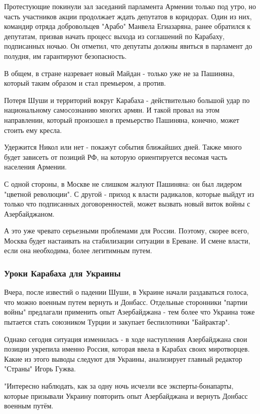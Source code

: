 Протестующие покинули зал заседаний парламента Армении только под утро, но
часть участников акции продолжает ждать депутатов в коридорах. Один из них,
командир отряда добровольцев "Арабо" Манвела Егиазаряна, ранее обратился к
депутатам, призвав начать процесс выхода из соглашений по Карабаху, подписанных
ночью. Он отметил, что депутаты должны явиться в парламент до полудня, им
гарантируют безопасность. 

В общем, в стране назревает новый Майдан - только уже не за Пашиняна, который
таким образом и стал премьером, а против. 

Потеря Шуши и территорий вокруг Карабаха - действительно большой удар по
национальному самосознанию многих армян. И такой провал на этом направлении,
который произошел в премьерство Пашиняна, конечно, может стоить ему кресла. 

Удержится Никол или нет - покажут события ближайших дней. Также много будет
зависеть от позиций РФ, на которую ориентируется весомая часть населения
Армении.

С одной стороны, в Москве не слишком жалуют Пашиняна: он был лидером "цветной
революции". С другой - приход к власти радикалов, которые выйдут из только что
подписанных договоренностей, может вызвать новый виток войны с Азербайджаном.

А это уже чревато серьезными проблемами для России. Поэтому, скорее всего,
Москва будет настаивать на стабилизации ситуации в Ереване. И смене власти,
если она необходима, более легитимным путем. 

\subsubsection{Уроки Карабаха для Украины}

Вчера, после известий о падении Шуши, в Украине начали раздаваться голоса, что
можно военным путем вернуть и Донбасс. Отдельные сторонники "партии войны"
предлагали применить опыт Азербайджана - тем более что Украина тоже пытается
стать союзником Турции и закупает беспилотники "Байрактар". 

Однако сегодня ситуация изменилась - в ходе наступления Азербайджана свои
позиции укрепила именно Россия, которая ввела в Карабах своих миротворцев.
Какие из этого выводы следуют для Украины, анализирует главный редактор
"Страны" Игорь Гужва. 

"Интересно наблюдать, как за одну ночь исчезли все эксперты-бонапарты, которые
призывали Украину повторить опыт Азербайджана и вернуть Донбасс военным путём.

